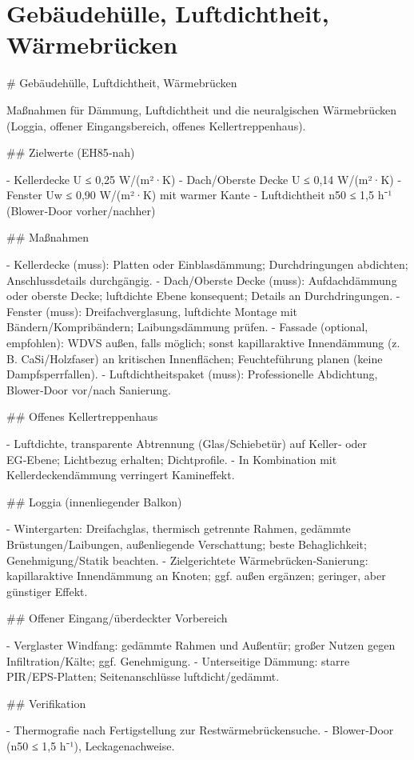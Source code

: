\documentclass[11pt,oneside]{report}
\begin{document}
\chapter{Gebäudehülle, Luftdichtheit, Wärmebrücken}
\begin{markdown}
# Gebäudehülle, Luftdichtheit, Wärmebrücken

Maßnahmen für Dämmung, Luftdichtheit und die neuralgischen Wärmebrücken (Loggia, offener Eingangsbereich, offenes Kellertreppenhaus).

## Zielwerte (EH85‑nah)

- Kellerdecke U ≤ 0,25 W/(m²·K)
- Dach/Oberste Decke U ≤ 0,14 W/(m²·K)
- Fenster Uw ≤ 0,90 W/(m²·K) mit warmer Kante
- Luftdichtheit n50 ≤ 1,5 h⁻¹ (Blower‑Door vorher/nachher)

## Maßnahmen

- Kellerdecke (muss): Platten oder Einblasdämmung; Durchdringungen abdichten; Anschlussdetails durchgängig.
- Dach/Oberste Decke (muss): Aufdachdämmung oder oberste Decke; luftdichte Ebene konsequent; Details an Durchdringungen.
- Fenster (muss): Dreifachverglasung, luftdichte Montage mit Bändern/Kompribändern; Laibungsdämmung prüfen.
- Fassade (optional, empfohlen): WDVS außen, falls möglich; sonst kapillaraktive Innendämmung (z. B. CaSi/Holzfaser) an kritischen Innenflächen; Feuchteführung planen (keine Dampfsperrfallen).
- Luftdichtheitspaket (muss): Professionelle Abdichtung, Blower‑Door vor/nach Sanierung.

## Offenes Kellertreppenhaus

- Luftdichte, transparente Abtrennung (Glas/Schiebetür) auf Keller‑ oder EG‑Ebene; Lichtbezug erhalten; Dichtprofile.
- In Kombination mit Kellerdeckendämmung verringert Kamineffekt.

## Loggia (innenliegender Balkon)

- Wintergarten: Dreifachglas, thermisch getrennte Rahmen, gedämmte Brüstungen/Laibungen, außenliegende Verschattung; beste Behaglichkeit; Genehmigung/Statik beachten.
- Zielgerichtete Wärmebrücken‑Sanierung: kapillaraktive Innendämmung an Knoten; ggf. außen ergänzen; geringer, aber günstiger Effekt.

## Offener Eingang/überdeckter Vorbereich

- Verglaster Windfang: gedämmte Rahmen und Außentür; großer Nutzen gegen Infiltration/Kälte; ggf. Genehmigung.
- Unterseitige Dämmung: starre PIR/EPS‑Platten; Seitenanschlüsse luftdicht/gedämmt.

## Verifikation

- Thermografie nach Fertigstellung zur Restwärmebrückensuche.
- Blower‑Door (n50 ≤ 1,5 h⁻¹), Leckagenachweise.
\end{markdown}
\end{document}
